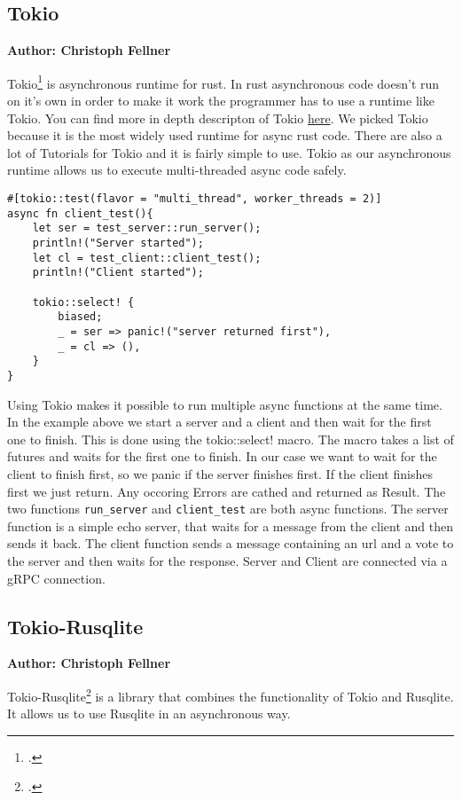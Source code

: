 \subsection{Tokio}
\textbf{Author: Christoph Fellner}

Tokio\footcite{tokio} is asynchronous runtime for rust. In rust asynchronous code doesn't run on it's own in order to make it work the programmer has to use a runtime like 
Tokio. You can find more in depth descripton of Tokio \href{https://tokio.rs/tokio/tutorial}{here}. 
We picked Tokio because it is the most widely used runtime for async rust code. There are also a lot of Tutorials for Tokio and it is fairly simple to use.
Tokio as our asynchronous runtime allows us to execute multi-threaded async code safely.  

\begin{verbatim}
#[tokio::test(flavor = "multi_thread", worker_threads = 2)]
async fn client_test(){ 
    let ser = test_server::run_server();
    println!("Server started");
    let cl = test_client::client_test();
    println!("Client started");

    tokio::select! {
        biased; 
        _ = ser => panic!("server returned first"),
        _ = cl => (),
    }           
}
\end{verbatim}

Using Tokio makes it possible to run multiple async functions at the same time. In the example above we start a server and a client and then wait for the first one to finish. 
This is done using the tokio::select! macro. The macro takes a list of futures and waits for the first one to finish. In our case we want to wait for the client to finish 
first, so we panic if the server finishes first. If the client finishes first we just return. Any occoring Errors are cathed and returned as Result.
The two functions \verb+run_server+ and \verb+client_test+ are both async functions. The server function is a simple echo server, that waits for a message from the client and 
then sends it back. The client function sends a message containing an url and a vote to the server and then waits for the response. Server and Client are connected via a gRPC 
connection. 

\subsection{Tokio-Rusqlite}
\textbf{Author: Christoph Fellner}

Tokio-Rusqlite\footcite{tokiolite} is a library that combines the functionality of Tokio and Rusqlite. It allows us to use Rusqlite in an asynchronous way. 

